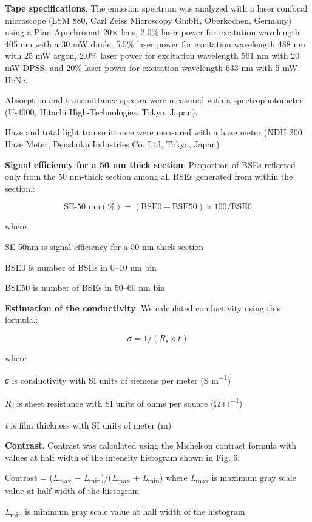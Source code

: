 \documentclass{article}
\begin{document}
\textbf{Tape specifications}. The emission spectrum was analyzed with a laser confocal microscope (LSM 880, Carl Zeiss Microscopy GmbH, Oberkochen, Germany) using a Plan-Apochromat 20× lens, 2.0\% laser power for excitation wavelength 405 nm with a 30 mW diode, 5.5\% laser power for excitation wavelength 488 nm with 25 mW argon, 2.0\% laser power for excitation wavelength 561 nm with 20 mW DPSS, and 20\% laser power for excitation wavelength 633 nm with 5 mW HeNe.

Absorption and transmittance spectra were measured with a spectrophotometer (U-4000, Hitachi High-Technologies, Tokyo, Japan).

Haze and total light transmittance were measured with a haze meter (NDH 200 Haze Meter, Denshoku Industries Co. Ltd, Tokyo, Japan)

\textbf{Signal efficiency for a 50 nm thick section}. Proportion of BSEs reflected only from the 50 nm-thick section among all BSEs generated from within the section.:

\[ \text{SE-50 nm}(\%) = (\text{BSE0} - \text{BSE50}) \times 100/\text{BSE0} \]

\noindent where

SE-50nm is signal efficiency for a 50 nm thick section

BSE0 is number of BSEs in 0–10 nm bin

BSE50 is number of BSEs in 50–60 nm bin

\textbf{Estimation of the conductivity}. We calculated conductivity using this formula.:

\[ \sigma = 1/(R_\text{s} \times t) \]

\noindent where

\emph{σ} is conductivity with SI units of siemens per meter (S m\textsuperscript{−1})

\emph{R}\textsubscript{s} is sheet resistance with SI units of ohms per square (Ω ◻\textsuperscript{−1})

\emph{t} is film thickness with SI units of meter (m)

\textbf{Contrast}. Contrast was calculated using the Michelson contrast formula with values at half width of the intensity histogram shown in Fig. 6.

Contrast = (\emph{L}\textsubscript{max} − \emph{L}\textsubscript{min})/(\emph{L}\textsubscript{max} + \emph{L}\textsubscript{min}) where \emph{L}\textsubscript{max} is maximum gray scale value at half width of the histogram

\emph{L}\textsubscript{min} is minimum gray scale value at half width of the histogram
\end{document}
